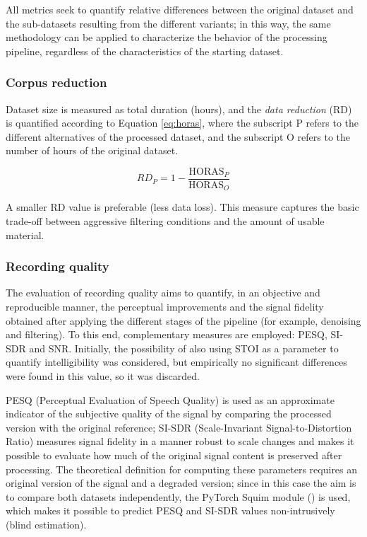 All metrics seek to quantify relative differences between the original dataset and the sub-datasets resulting from the different variants; in this way, the same methodology can be applied to characterize the behavior of the processing pipeline, regardless of the characteristics of the starting dataset.

\subsubsection{Corpus reduction}
Dataset size is measured as total duration (hours), and the \emph{data reduction} (RD) is quantified according to Equation \ref{eq:horas}, where the subscript P refers to the different alternatives of the processed dataset, and the subscript O refers to the number of hours of the original dataset.

\begin{equation}
\label{eq:horas}
RD_P = 1 - \frac{\mathrm{HORAS}_P}{\mathrm{HORAS}_O}
\end{equation}

A smaller RD value is preferable (less data loss). This measure captures the basic trade-off between aggressive filtering conditions and the amount of usable material.

\subsubsection{Recording quality}
The evaluation of recording quality aims to quantify, in an objective and reproducible manner, the perceptual improvements and the signal fidelity obtained after applying the different stages of the pipeline (for example, denoising and filtering). To this end, complementary measures are employed: PESQ, SI-SDR and SNR. Initially, the possibility of also using STOI as a parameter to quantify intelligibility was considered, but empirically no significant differences were found in this value, so it was discarded.

PESQ (Perceptual Evaluation of Speech Quality) is used as an approximate indicator of the subjective quality of the signal by comparing the processed version with the original reference; SI-SDR (Scale-Invariant Signal-to-Distortion Ratio) measures signal fidelity in a manner robust to scale changes and makes it possible to evaluate how much of the original signal content is preserved after processing. The theoretical definition for computing these parameters requires an original version of the signal and a degraded version; since in this case the aim is to compare both datasets independently, the PyTorch Squim module (\cite{squim}) is used, which makes it possible to predict PESQ and SI-SDR values non-intrusively (blind estimation).

